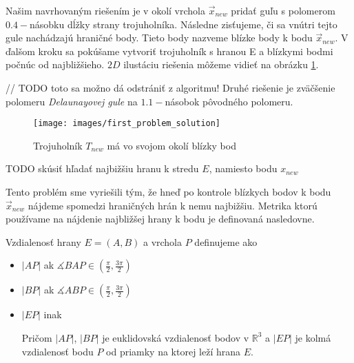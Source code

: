 Našim navrhovaným riešením je v okolí vrchola $\overrightarrow{x}_{new}$ pridať guľu s polomerom $0.4-$násobku 
dĺžky strany trojuholníka. Následne zisťujeme, či sa vnútri tejto gule nachádzajú hraničné body. 
Tieto body nazveme blízke body k bodu $\overrightarrow{x}_{new}$. V ďalšom kroku sa pokúšame vytvoriť trojuholník s
hranou E a blízkymi bodmi počnúc od najbližšieho. $2D$ ilustáciu riešenia môžeme vidieť na obrázku 
\ref{obr:first_problem_solution}. 

// TODO toto sa možno dá odstrániť z algoritmu!
Druhé riešenie je zväčšenie polomeru \textit{Delaunayovej gule} na $1.1-$násobok pôvodného polomeru.



\begin{figure}
    \centerline{\texttt{[image: images/first\_problem\_solution]}}
    \caption[Trojuholník $T_{new}$ má vo svojom okolí blízky bod]{Trojuholník $T_{new}$ má vo svojom okolí blízky bod}
    \label{obr:first_problem_solution}
\end{figure}






TODO skúsiť hľadať najbižšiu hranu k stredu $E$, namiesto bodu $x_{new}$

Tento problém sme vyriešili tým, že hneď po kontrole blízkych bodov k bodu 
$\overrightarrow{x}_{new}$ nájdeme spomedzi hraničných hrán k nemu najbižšiu. 
Metrika ktorú používame na nájdenie najbližšej hrany k bodu je definovaná nasledovne.

\begin{definition} Vzdialenosť hrany $E=(A,B)$ a vrchola $P$ definujeme ako
\begin{itemize}
    \item{
        $|AP|$ ak $\measuredangle BAP \in (\frac{\pi}{2}, \frac{3\pi}{2})$
    }

    \item{
        $|BP|$ ak $\measuredangle ABP \in (\frac{\pi}{2}, \frac{3\pi}{2})$
    }

    \item{
        $|EP|$ inak
    }

    
    Pričom $|AP|$, $|BP|$ je euklidovská vzdialenosť bodov v $\mathbb{R}^3$ a $|EP|$ je kolmá 
    vzdialenosť bodu $P$ od priamky na ktorej leží hrana $E$.
\end{itemize}

\end{definition}

